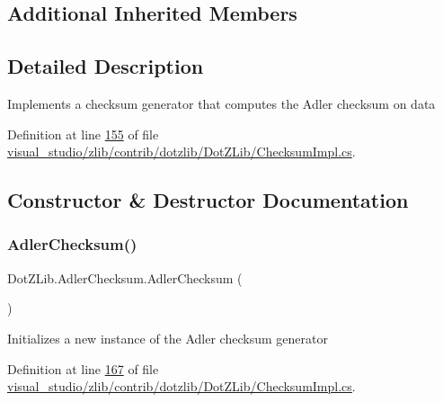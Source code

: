 \subsection*{Additional Inherited Members}


\subsection{Detailed Description}
Implements a checksum generator that computes the Adler checksum on data 



Definition at line \hyperlink{visual__studio_2zlib_2contrib_2dotzlib_2_dot_z_lib_2_checksum_impl_8cs_source_l00155}{155} of file \hyperlink{visual__studio_2zlib_2contrib_2dotzlib_2_dot_z_lib_2_checksum_impl_8cs_source}{visual\+\_\+studio/zlib/contrib/dotzlib/\+Dot\+Z\+Lib/\+Checksum\+Impl.\+cs}.



\subsection{Constructor \& Destructor Documentation}
\mbox{\label{class_dot_z_lib_1_1_adler_checksum_a8b968384065103a827ac7bfb7bfab66d}} 
\subsubsection{\texorpdfstring{Adler\+Checksum()}{AdlerChecksum()}\hspace{0.1cm}{\footnotesize\ttfamily [1/4]}}
{\footnotesize\ttfamily Dot\+Z\+Lib.\+Adler\+Checksum.\+Adler\+Checksum (\begin{DoxyParamCaption}{ }\end{DoxyParamCaption})\hspace{0.3cm}{\ttfamily [inline]}}



Initializes a new instance of the Adler checksum generator 



Definition at line \hyperlink{visual__studio_2zlib_2contrib_2dotzlib_2_dot_z_lib_2_checksum_impl_8cs_source_l00167}{167} of file \hyperlink{visual__studio_2zlib_2contrib_2dotzlib_2_dot_z_lib_2_checksum_impl_8cs_source}{visual\+\_\+studio/zlib/contrib/dotzlib/\+Dot\+Z\+Lib/\+Checksum\+Impl.\+cs}.

